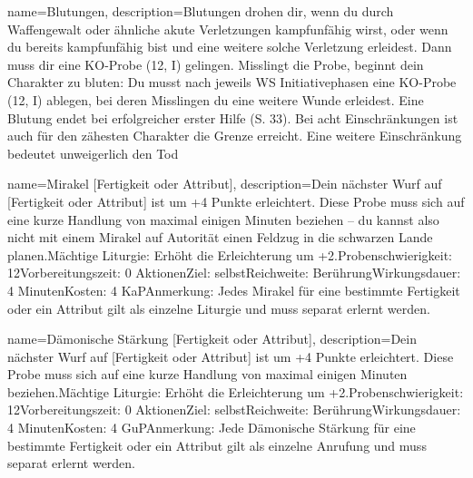 {
    name={Blutungen},
    description={Blutungen drohen dir, wenn du durch Waffengewalt oder ähnliche akute Verletzungen kampfunfähig wirst, oder wenn du bereits kampfunfähig bist und eine weitere solche Verletzung erleidest. Dann muss dir eine KO-Probe (12, I) gelingen. Misslingt die Probe, beginnt dein Charakter zu bluten: Du musst nach jeweils WS Initiativephasen eine KO-Probe (12, I) ablegen, bei deren Misslingen du eine weitere Wunde erleidest. Eine Blutung endet bei erfolgreicher erster Hilfe (S. 33). Bei acht Einschränkungen ist auch für den zähesten Charakter die Grenze erreicht. Eine weitere Einschränkung bedeutet unweigerlich den Tod}
}


{
    name={Mirakel [Fertigkeit oder Attribut]},
    description={Dein nächster Wurf auf [Fertigkeit oder Attribut] ist um +4 Punkte erleichtert. Diese Probe muss sich auf eine kurze Handlung von maximal einigen Minuten beziehen – du kannst also nicht mit einem Mirakel auf Autorität einen Feldzug in die schwarzen Lande planen.\newline Mächtige Liturgie: Erhöht die Erleichterung um +2.\newline Probenschwierigkeit: 12\newline Vorbereitungszeit: 0 Aktionen\newline Ziel: selbst\newline Reichweite: Berührung\newline Wirkungsdauer: 4 Minuten\newline Kosten: 4 KaP\newline Anmerkung: Jedes Mirakel für eine bestimmte Fertigkeit oder ein Attribut gilt als einzelne Liturgie und muss separat erlernt werden.}
}


{
    name={Dämonische Stärkung [Fertigkeit oder Attribut]},
    description={Dein nächster Wurf auf [Fertigkeit oder Attribut] ist um +4 Punkte erleichtert. Diese Probe muss sich auf eine kurze Handlung von maximal einigen Minuten beziehen.\newline Mächtige Liturgie: Erhöht die Erleichterung um +2.\newline Probenschwierigkeit: 12\newline Vorbereitungszeit: 0 Aktionen\newline Ziel: selbst\newline Reichweite: Berührung\newline Wirkungsdauer: 4 Minuten\newline Kosten: 4 GuP\newline Anmerkung: Jede Dämonische Stärkung für eine bestimmte Fertigkeit oder ein Attribut gilt als einzelne Anrufung und muss separat erlernt werden.}
}


